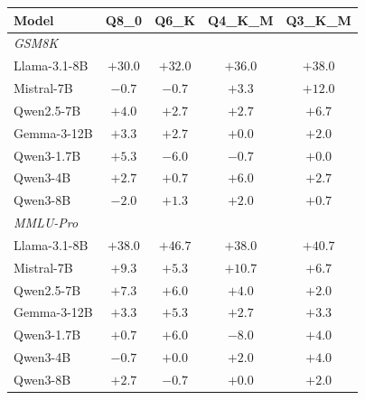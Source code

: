 \begin{tabular}{lcccc}
\toprule
Model & Q8\_0 & Q6\_K & Q4\_K\_M & Q3\_K\_M \\
\midrule
\multicolumn{5}{l}{\emph{GSM8K}} \\
Llama-3.1-8B & $+30.0$ & $+32.0$ & $+36.0$ & $+38.0$ \\
Mistral-7B & $-0.7$ & $-0.7$ & $+3.3$ & $+12.0$ \\
Qwen2.5-7B & $+4.0$ & $+2.7$ & $+2.7$ & $+6.7$ \\
Gemma-3-12B & $+3.3$ & $+2.7$ & $+0.0$ & $+2.0$ \\
Qwen3-1.7B & $+5.3$ & $-6.0$ & $-0.7$ & $+0.0$ \\
Qwen3-4B & $+2.7$ & $+0.7$ & $+6.0$ & $+2.7$ \\
Qwen3-8B & $-2.0$ & $+1.3$ & $+2.0$ & $+0.7$ \\
\midrule
\multicolumn{5}{l}{\emph{MMLU-Pro}} \\
Llama-3.1-8B & $+38.0$ & $+46.7$ & $+38.0$ & $+40.7$ \\
Mistral-7B & $+9.3$ & $+5.3$ & $+10.7$ & $+6.7$ \\
Qwen2.5-7B & $+7.3$ & $+6.0$ & $+4.0$ & $+2.0$ \\
Gemma-3-12B & $+3.3$ & $+5.3$ & $+2.7$ & $+3.3$ \\
Qwen3-1.7B & $+0.7$ & $+6.0$ & $-8.0$ & $+4.0$ \\
Qwen3-4B & $-0.7$ & $+0.0$ & $+2.0$ & $+4.0$ \\
Qwen3-8B & $+2.7$ & $-0.7$ & $+0.0$ & $+2.0$ \\
\bottomrule
\end{tabular}
